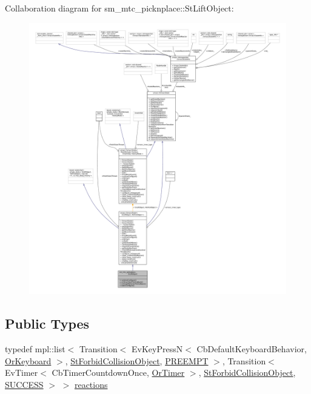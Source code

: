 Collaboration diagram for sm\+\_\+mtc\+\_\+picknplace\+:\+:St\+Lift\+Object\+:
\nopagebreak
\begin{figure}[H]
\begin{center}
\leavevmode
\includegraphics[width=350pt]{structsm__mtc__picknplace_1_1StLiftObject__coll__graph}
\end{center}
\end{figure}
\subsection*{Public Types}
\begin{DoxyCompactItemize}
\item 
typedef mpl\+::list$<$ Transition$<$ Ev\+Key\+PressN$<$ Cb\+Default\+Keyboard\+Behavior, \hyperlink{classsm__mtc__picknplace_1_1OrKeyboard}{Or\+Keyboard} $>$, \hyperlink{structsm__mtc__picknplace_1_1StForbidCollisionObject}{St\+Forbid\+Collision\+Object}, \hyperlink{classPREEMPT}{P\+R\+E\+E\+M\+PT} $>$, Transition$<$ Ev\+Timer$<$ Cb\+Timer\+Countdown\+Once, \hyperlink{classsm__mtc__picknplace_1_1OrTimer}{Or\+Timer} $>$, \hyperlink{structsm__mtc__picknplace_1_1StForbidCollisionObject}{St\+Forbid\+Collision\+Object}, \hyperlink{classSUCCESS}{S\+U\+C\+C\+E\+SS} $>$ $>$ \hyperlink{structsm__mtc__picknplace_1_1StLiftObject_a2aed6ba4e045255d980eb99a087d950f}{reactions}
\end{DoxyCompactItemize}
